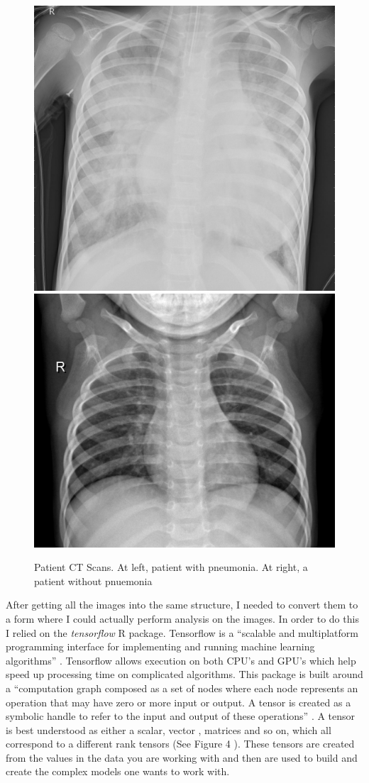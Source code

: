 \documentclass[12pt]{article}
\begin{document}
\begin{figure}
\includegraphics[width=0.49\linewidth,height=0.25\textheight]{images/pneumonia} \includegraphics[width=0.49\linewidth,height=0.25\textheight]{images/normal} \caption{Patient CT Scans. At left, patient with pneumonia. At right, a patient without pnuemonia}\label{fig:sample-fig3}
\end{figure}

After getting all the images into the same structure, I needed to
convert them to a form where I could actually perform analysis on the
images. In order to do this I relied on the \emph{tensorflow} R package.
Tensorflow is a ``scalable and multiplatform programming interface for
implementing and running machine learning algorithms'' \citet{PML}.
Tensorflow allows execution on both CPU's and GPU's which help speed up
processing time on complicated algorithms. This package is built around
a ``computation graph composed as a set of nodes where each node
represents an operation that may have zero or more input or output. A
tensor is created as a symbolic handle to refer to the input and output
of these operations'' \citet{PML}. A tensor is best understood as either
a scalar, vector , matrices and so on, which all correspond to a
different rank tensors (See Figure 4 \citet{PML}). These tensors are
created from the values in the data you are working with and then are
used to build and create the complex models one wants to work with.
\end{document}
